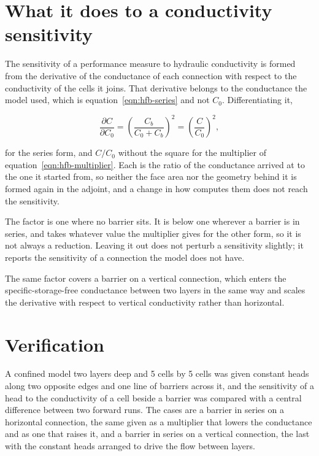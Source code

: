 \section*{What it does to a conductivity sensitivity}

The sensitivity of a performance measure to hydraulic conductivity is formed from the derivative of the conductance of each connection with respect to the conductivity of the cells it joins. That derivative belongs to the conductance the model used, which is equation~\ref{eqn:hfb-series} and not $C_{0}$. Differentiating it,

\begin{equation}
	\label{eqn:hfb-derivative}
	\frac{\partial C}{\partial C_{0}} =
	\left( \frac{C_{b}}{C_{0} + C_{b}} \right)^{2} =
	\left( \frac{C}{C_{0}} \right)^{2},
\end{equation}

\noindent for the series form, and $C / C_{0}$ without the square for the multiplier of equation~\ref{eqn:hfb-multiplier}. Each is the ratio of the conductance \mf{} arrived at to the one it started from, so neither the face area nor the geometry behind it is formed again in the adjoint, and a change in how \mf{} computes them does not reach the sensitivity.

The factor is one where no barrier sits. It is below one wherever a barrier is in series, and takes whatever value the multiplier gives for the other form, so it is not always a reduction. Leaving it out does not perturb a sensitivity slightly; it reports the sensitivity of a connection the model does not have.

The same factor covers a barrier on a vertical connection, which enters the specific-storage-free conductance between two layers in the same way and scales the derivative with respect to vertical conductivity rather than horizontal.

\section*{Verification}

A confined model two layers deep and 5 cells by 5 cells was given constant heads along two opposite edges and one line of barriers across it, and the sensitivity of a head to the conductivity of a cell beside a barrier was compared with a central difference between two forward runs. The cases are a barrier in series on a horizontal connection, the same given as a multiplier that lowers the conductance and as one that raises it, and a barrier in series on a vertical connection, the last with the constant heads arranged to drive the flow between layers.

